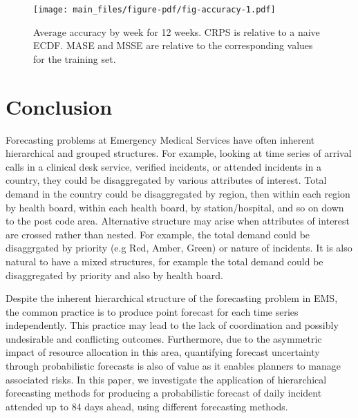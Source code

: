 \documentclass[
  authoryear,
  preprint,
  3p]{elsarticle}
\begin{document}
\begin{figure}[H]

{\centering \texttt{[image: main\_files/figure-pdf/fig-accuracy-1.pdf]}

}

\caption{\label{fig-accuracy}Average accuracy by week for 12 weeks. CRPS
is relative to a naive ECDF. MASE and MSSE are relative to the
corresponding values for the training set.}

\end{figure}

\hypertarget{sec-conclusion}{%
\section{Conclusion}\label{sec-conclusion}}

Forecasting problems at Emergency Medical Services have often inherent
hierarchical and grouped structures. For example, looking at time series
of arrival calls in a clinical desk service, verified incidents, or
attended incidents in a country, they could be disaggregated by various
attributes of interest. Total demand in the country could be
disaggregated by region, then within each region by health board, within
each health board, by station/hospital, and so on down to the post code
area. Alternative structure may arise when attributes of interest are
crossed rather than nested. For example, the total demand could be
disaggrgated by priority (e.g Red, Amber, Green) or nature of incidents.
It is also natural to have a mixed structures, for example the total
demand could be disaggregated by priority and also by health board.

Despite the inherent hierarchical structure of the forecasting problem
in EMS, the common practice is to produce point forecast for each time
series independently. This practice may lead to the lack of coordination
and possibly undesirable and conflicting outcomes. Furthermore, due to
the asymmetric impact of resource allocation in this area, quantifying
forecast uncertainty through probabilistic forecasts is also of value as
it enables planners to manage associated risks. In this paper, we
investigate the application of hierarchical forecasting methods for
producing a probabilistic forecast of daily incident attended up to 84
days ahead, using different forecasting methods.
\end{document}

